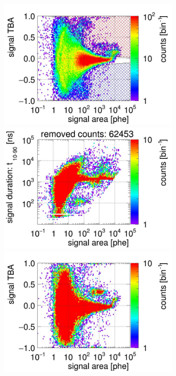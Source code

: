 \begin{landscape}
\begin{figure}[!p]
\begin{subfigure}[t]{0.32\textwidth}
			\includegraphics[width=\figurewidth,clip,trim={0 98 0 40}]{Figures/GasTest/CutsValid/res64771/tbapa26Vecfig64771.jpg}
			\includegraphics[width=\figurewidth,clip,trim={0 98 0 15}]{Figures/GasTest/CutsValid/res64771/pdpaX26Vecfig64771.jpg}
			\includegraphics[width=\figurewidth,clip,trim={0 8 0 40}]{Figures/GasTest/CutsValid/res64771/tbapaX26Vecfig64771.jpg}

\end{subfigure}
\end{figure}
\end{landscape}
